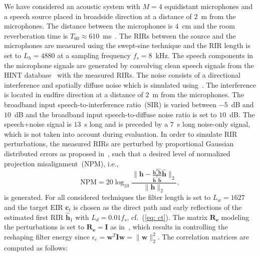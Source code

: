 \documentclass[draftcls,onecolumn,11pt]{IEEEtran}
\begin{document}
We have considered an acoustic system with $M=4$ equidistant microphones and a speech source placed in broadside direction at a distance of $2$~m from the microphones.
The distance between the microphones is $4$~cm and the room reverberation time is $T_{60} \approx 610$~ms~\cite{hadad_IWAENC_2014}.
The RIRs between the source and the microphones are measured using the swept-sine technique and the RIR length is set to $L_h = 4880$ at a sampling frequency $f_s = 8$~kHz.
The speech components in the microphone signals are generated by convolving clean speech signals from the HINT database~\cite{Nilsson_JASA_1994} with the measured RIRs.
The noise consists of a directional interference and spatially diffuse noise which is simulated using~\cite{Habets2008}.
The interference is located in endfire direction at a distance of $2$~m from the microphones.
The broadband input speech-to-interference ratio~(SIR) is varied between $-5$~dB and $10$~dB and the broadband input speech-to-diffuse noise ratio is set to $10$~dB.
The speech+noise signal is $13$~s long and is preceded by a $7$~s long noise-only signal, which is not taken into account during evaluation.
In order to simulate RIR perturbations, the measured RIRs are perturbed by proportional Gaussian distributed errors as proposed in~\cite{Zhang_HINDAWI_2008}, such that a desired level of normalized projection misalignment~(NPM), i.e.,
\begin{equation}
{\text{NPM}} = 20 \log_{10} \frac{\| \mathbf{h} - \frac{\mathbf{h}^T\hat{\mathbf{h}}}{\hat{\mathbf{h}}^T\hat{\mathbf{h}}}\hat{\mathbf{h}}\|_2}{\| \mathbf{h} \|_2},
\end{equation}
is generated.
For all considered techniques the filter length is set to $L_w = 1627$ and the target EIR $\mathbf{c}_t$ is chosen as the direct path and early reflections of the estimated first RIR $\hat{\mathbf{h}}_1$ with $L_d = 0.01 f_s$, cf.~(\ref{eq: ct}).
The matrix $\mathbf{R}_{\mathbf{e}}$ modeling the perturbations is set to $\mathbf{R}_{\mathbf{e}} = \mathbf{I}$ as in~\cite{Kodrasi_ITASLP_2013,Hikichi_EURASIP_2007}, which results in controlling the reshaping filter energy since $\epsilon_e = \mathbf{w}^T\mathbf{I}\mathbf{w} = \| \mathbf{w} \|_2^2$.
The correlation matrices are computed as follows:
\end{document}
